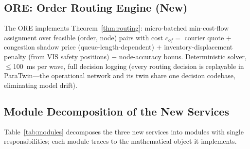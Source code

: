 \documentclass[journal]{IEEEtran}
\begin{document}
\subsection{ORE: Order Routing Engine (New)}
The ORE implements Theorem~\ref{thm:routing}: micro-batched min-cost-flow assignment over feasible (order, node) pairs with cost $c_{of} = $ courier quote $+$ congestion shadow price (queue-length-dependent) $+$ inventory-displacement penalty (from VIS safety positions) $-$ node-accuracy bonus. Deterministic solver, $\le$100~ms per wave, full decision logging (every routing decision is replayable in ParaTwin---the operational network and its twin share one decision codebase, eliminating model drift).

\subsection{Module Decomposition of the New Services}
Table~\ref{tab:modules} decomposes the three new services into modules with single responsibilities; each module traces to the mathematical object it implements.
\end{document}
